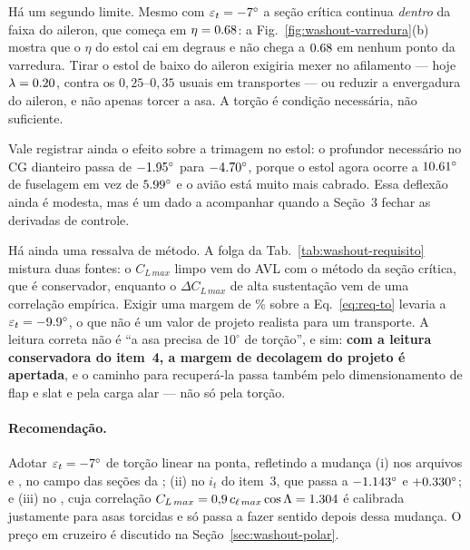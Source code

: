 Há um segundo limite. Mesmo com $\varepsilon_t = -7^\circ$ a seção crítica
continua \emph{dentro} da faixa do aileron, que começa em
$\eta = 0.68$: a Fig.~\ref{fig:washout-varredura}(b) mostra que o $\eta$ do
estol cai em degraus e não chega a $0.68$ em nenhum ponto da varredura.
Tirar o estol de baixo do aileron exigiria mexer no afilamento --- hoje
$\lambda = 0.20$, contra os $0{,}25$--$0{,}35$ usuais em transportes
--- ou reduzir a envergadura do aileron, e não apenas torcer a asa. A torção é
condição necessária, não suficiente.

Vale registrar ainda o efeito sobre a trimagem no estol: o profundor
necessário no CG dianteiro passa de $-1.95^\circ$ para
$-4.70^\circ$, porque o estol agora ocorre a $10.61^\circ$ de
fuselagem em vez de $5.99^\circ$ e o avião está muito mais cabrado. Essa
deflexão ainda é modesta, mas é um dado a acompanhar quando a Seção~3 fechar as
derivadas de controle.

Há ainda uma ressalva de método. A folga da Tab.~\ref{tab:washout-requisito}
mistura duas fontes: o $C_{L\,max}$ limpo vem do AVL com o método da seção
crítica, que é conservador, enquanto o $\Delta C_{L\,max}$ de alta sustentação
vem de uma correlação empírica. Exigir uma margem de \woMargem\% sobre a
Eq.~\eqref{eq:req-to} levaria a $\varepsilon_t = -9.9^\circ$, o que não é
um valor de projeto realista para um transporte. A leitura correta não é ``a
asa precisa de $10^\circ$ de torção'', e sim: \textbf{com a leitura conservadora
do item~4, a margem de decolagem do projeto é apertada}, e o caminho para
recuperá-la passa também pelo dimensionamento de flap e slat e pela carga
alar --- não só pela torção.

\paragraph{Recomendação.}
Adotar $\varepsilon_t = -7^\circ$ de torção linear na ponta, refletindo a
mudança (i) nos arquivos  e , no campo 
das seções da ; (ii) no $i_t$ do item~3, que passa a
$-1.143^\circ$ e $+0.330^\circ$; e (iii) no , cuja
correlação $C_{L\,max} = 0{,}9\,c_{\ell\,max}\cos\Lambda = 1.304$ é
calibrada justamente para asas torcidas e só passa a fazer sentido depois dessa
mudança. O preço em cruzeiro é discutido na Seção~\ref{sec:washout-polar}.
